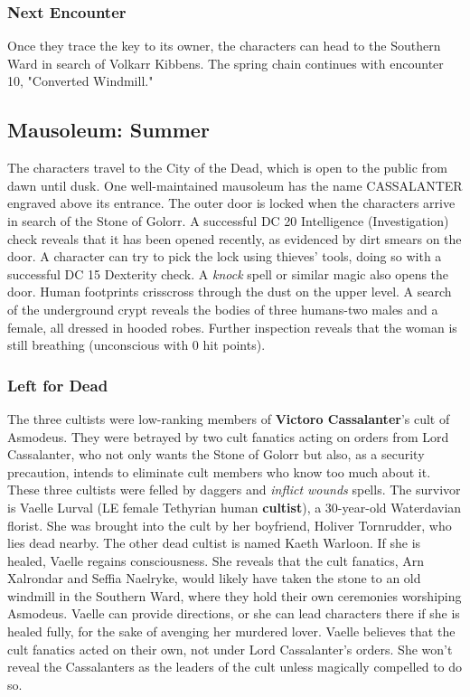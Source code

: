 \documentclass[10pt,a4paper,twoside,twocolumn,openany,nodeprecatedcode]{dndbook}
\begin{document}
\subsubsection{Next Encounter}
Once they trace the key to its owner, the characters can head to the Southern Ward in search of Volkarr Kibbens. The spring chain continues with encounter 10, "Converted Windmill."
\subsection{Mausoleum: Summer}
The characters travel to the City of the Dead, which is open to the public from dawn until dusk. One well-maintained mausoleum has the name CASSALANTER engraved above its entrance. The outer door is locked when the characters arrive in search of the Stone of Golorr. A successful DC 20 Intelligence (Investigation) check reveals that it has been opened recently, as evidenced by dirt smears on the door. A character can try to pick the lock using thieves' tools, doing so with a successful DC 15 Dexterity check. A \textit{knock} spell or similar magic also opens the door.
Human footprints crisscross through the dust on the upper level. A search of the underground crypt reveals the bodies of three humans-two males and a female, all dressed in hooded robes. Further inspection reveals that the woman is still breathing (unconscious with 0 hit points).
\subsubsection{Left for Dead}
The three cultists were low-ranking members of \textbf{Victoro Cassalanter}'s cult of Asmodeus. They were betrayed by two cult fanatics acting on orders from Lord Cassalanter, who not only wants the Stone of Golorr but also, as a security precaution, intends to eliminate cult members who know too much about it. These three cultists were felled by daggers and \textit{inflict wounds} spells.
The survivor is Vaelle Lurval (LE female Tethyrian human \textbf{cultist}), a 30-year-old Waterdavian florist. She was brought into the cult by her boyfriend, Holiver Tornrudder, who lies dead nearby. The other dead cultist is named Kaeth Warloon.
If she is healed, Vaelle regains consciousness. She reveals that the cult fanatics, Arn Xalrondar and Seffia Naelryke, would likely have taken the stone to an old windmill in the Southern Ward, where they hold their own ceremonies worshiping Asmodeus. Vaelle can provide directions, or she can lead characters there if she is healed fully, for the sake of avenging her murdered lover.
Vaelle believes that the cult fanatics acted on their own, not under Lord Cassalanter's orders. She won't reveal the Cassalanters as the leaders of the cult unless magically compelled to do so.
\end{document}
